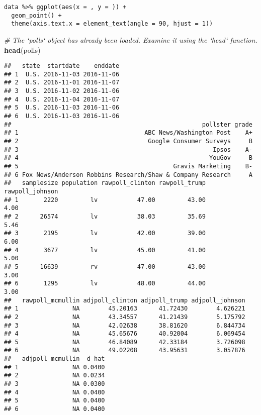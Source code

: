 \documentclass[]{article}
\newenvironment{Shaded}{\begin{snugshade}}{\end{snugshade}}
\newcommand{\KeywordTok}[1]{\textcolor[rgb]{0.13,0.29,0.53}{\textbf{#1}}}
\newcommand{\CommentTok}[1]{\textcolor[rgb]{0.56,0.35,0.01}{\textit{#1}}}
\newcommand{\NormalTok}[1]{#1}
\begin{document}
\begin{verbatim}
data %>% ggplot(aes(x = , y = )) +
  geom_point() +
  theme(axis.text.x = element_text(angle = 90, hjust = 1))
\end{verbatim}

\begin{Shaded}
\begin{Highlighting}[]
\CommentTok{# The `polls` object has already been loaded. Examine it using the `head` function.}
\KeywordTok{head}\NormalTok{(polls)}
\end{Highlighting}
\end{Shaded}

\begin{verbatim}
##   state  startdate    enddate
## 1  U.S. 2016-11-03 2016-11-06
## 2  U.S. 2016-11-01 2016-11-07
## 3  U.S. 2016-11-02 2016-11-06
## 4  U.S. 2016-11-04 2016-11-07
## 5  U.S. 2016-11-03 2016-11-06
## 6  U.S. 2016-11-03 2016-11-06
##                                                     pollster grade
## 1                                   ABC News/Washington Post    A+
## 2                                    Google Consumer Surveys     B
## 3                                                      Ipsos    A-
## 4                                                     YouGov     B
## 5                                           Gravis Marketing    B-
## 6 Fox News/Anderson Robbins Research/Shaw & Company Research     A
##   samplesize population rawpoll_clinton rawpoll_trump rawpoll_johnson
## 1       2220         lv           47.00         43.00            4.00
## 2      26574         lv           38.03         35.69            5.46
## 3       2195         lv           42.00         39.00            6.00
## 4       3677         lv           45.00         41.00            5.00
## 5      16639         rv           47.00         43.00            3.00
## 6       1295         lv           48.00         44.00            3.00
##   rawpoll_mcmullin adjpoll_clinton adjpoll_trump adjpoll_johnson
## 1               NA        45.20163      41.72430        4.626221
## 2               NA        43.34557      41.21439        5.175792
## 3               NA        42.02638      38.81620        6.844734
## 4               NA        45.65676      40.92004        6.069454
## 5               NA        46.84089      42.33184        3.726098
## 6               NA        49.02208      43.95631        3.057876
##   adjpoll_mcmullin  d_hat
## 1               NA 0.0400
## 2               NA 0.0234
## 3               NA 0.0300
## 4               NA 0.0400
## 5               NA 0.0400
## 6               NA 0.0400
\end{verbatim}
\end{document}
